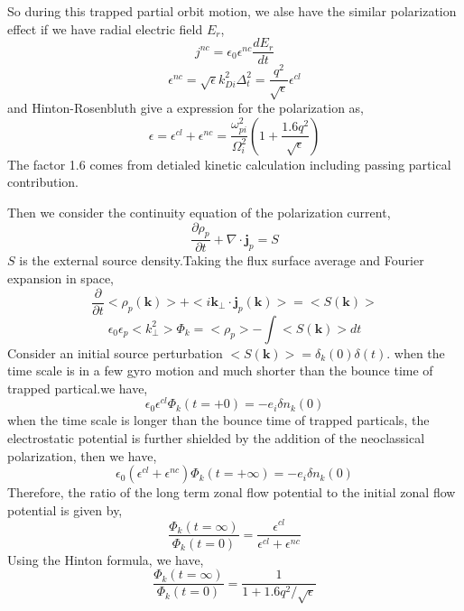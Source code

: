 \documentclass[11pt,a4paper]{article}
\begin{document}
	So during this trapped partial orbit motion, we alse have the similar polarization effect if we have radial electric field $E_r$, 
	\begin{equation}
		j^{nc}=\epsilon_0\epsilon^{nc}\frac{dE_r}{dt}
	\end{equation}
	\begin{equation}
		\epsilon^{nc}=\sqrt{\epsilon}k_{Di}^2\Delta_t^2=\frac{q^2}{\sqrt{\epsilon}}\epsilon^{cl}
	\end{equation}
	and Hinton-Rosenbluth give a expression for the polarization as,
	\begin{equation}
		\epsilon=\epsilon^{cl}+\epsilon^{nc}=\frac{\omega_{pi}^2}{\Omega_i^2}(1+\frac{1.6q^2}{\sqrt{\epsilon}})
	\end{equation}
	The factor 1.6 comes from detialed kinetic calculation including passing partical contribution.
	
	Then we consider the continuity equation of the polarization current,
	\begin{equation}
		\frac{\partial\rho_p}{\partial{t}}+\nabla\cdot\pmb{j}_p=S		
	\end{equation}
	$S$ is the external source density.Taking the flux surface average and Fourier expansion in space, 
	\begin{equation}
		\frac{\partial}{\partial{t}}<\rho_p(\pmb{k})>+<i\pmb{k}_\perp\cdot{\pmb{j}_p}(\pmb{k})>=<S(\pmb{k})>
	\end{equation}
	\begin{equation}
		\epsilon_0\epsilon_p<k_\perp^2>\Phi_k=<\rho_p>-\int<S(\pmb{k})>dt
	\end{equation}
	Consider an initial source perturbation $<S(\pmb{k})>=\delta_k(0)\delta(t)$. when the time scale is in a few gyro motion and much shorter than the bounce time of trapped partical.we have,
	\begin{equation}
		\epsilon_0\epsilon^{cl}\Phi_k(t=+0)=-e_i\delta{n_k(0)}
	\end{equation} 
	when the time scale is longer than the bounce time of trapped particals, the electrostatic potential is further shielded by the addition of the neoclassical polarization, then we have,
	\begin{equation}
		\epsilon_0(\epsilon^{cl}+\epsilon^{nc})\Phi_k(t=+\infty)=-e_i\delta{n_k(0)}
	\end{equation}
	Therefore, the ratio of the long term zonal flow potential to the initial zonal flow potential is given by, 
	\begin{equation}
		\frac{\Phi_k(t=\infty)}{\Phi_k(t=0)}=\frac{\epsilon^{cl}}{\epsilon^{cl}+\epsilon^{nc}}
	\end{equation}
	Using the Hinton formula, we have,
	\begin{equation}
		\frac{\Phi_k(t=\infty)}{\Phi_k(t=0)}=\frac{1}{1+1.6q^2/\sqrt{\epsilon}}
	\end{equation}
		
\end{document}
